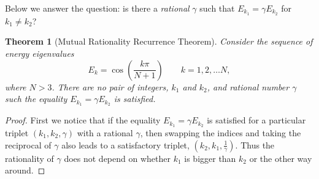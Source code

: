 \documentclass[a4paper, 10pt]{article}
\theoremstyle{plain}
\newtheorem*{theorem*}{Theorem}
\begin{document}
Below we answer the question: is there a {\emph{rational}} $\gamma$ such that
$E_{k_{1}} = \gamma E_{k_{2}}$ for $k_{1} \ne k_{2}$?

\begin{theorem*}[Mutual Rationality Recurrence Theorem]
    Consider the sequence of energy eigenvalues
    \begin{equation*}
        E_{k} = \cos{\!\left ( \frac{k \pi}{N+1} \right )}
        \qquad k=1, 2, \dots N,
    \end{equation*}
    where $N >3$. There are no pair of integers, $k_{1}$ and $k_{2}$, and
    rational number $\gamma$ such the equality $E_{k_{1}} = \gamma E_{k_{2}}$ is
    satisfied.
\end{theorem*}
\begin{proof}
    First we notice that if the equality $E_{k_{1}} = \gamma E_{k_{2}}$ is
    satisfied for a particular triplet $(k_{1}, k_{2}, \gamma)$ with a rational
    $\gamma$, then swapping the indices and taking the reciprocal of $\gamma$
    also leads to a satisfactory triplet, $(k_{2}, k_{1}, \frac{1}{\gamma})$.
    Thus the rationality of $\gamma$ does not depend on whether $k_{1}$ is
    bigger than $k_{2}$ or the other way around.


\end{proof}
\end{document}
